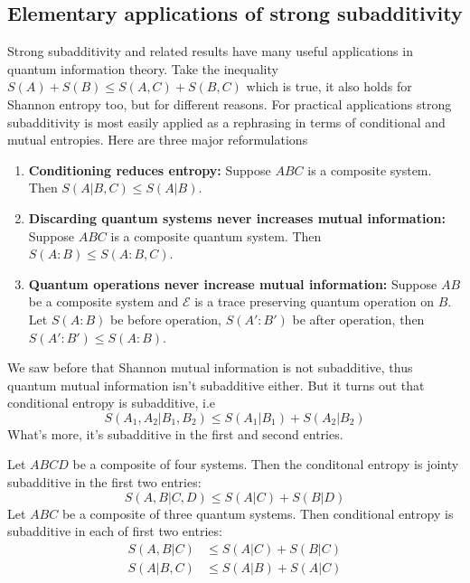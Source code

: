 \subsection{Elementary applications of strong subadditivity}
Strong subadditivity and related results have many useful applications in quantum information theory. Take the inequality $S(A)+S(B)\leq S(A,C)+S(B,C)$ which is true, it also holds for Shannon entropy too, but for different reasons. For practical applications strong subadditivity is most easily applied as a rephrasing in terms of conditional and mutual entropies. Here are three major reformulations
\begin{ntheorem}
    \begin{enumerate}
        \item \textbf{Conditioning reduces entropy:} Suppose $ABC$ is a composite system. Then $S(A|B,C)\leq S(A|B)$.
        \item \textbf{Discarding quantum systems never increases mutual information:} Suppose $ABC$ is a composite quantum system. Then $S(A:B) \leq S(A:B,C)$.
        \item \textbf{Quantum operations never increase mutual information:} Suppose $AB$ be a composite system and $\mathcal{E}$ is a trace preserving quantum operation on $B$. Let $S(A:B)$ be before operation, $S(A':B')$ be after operation, then $S(A':B') \leq S(A:B)$.
    \end{enumerate}
\end{ntheorem}
We saw before that Shannon mutual information is not subadditive, thus quantum mutual information isn't subadditive either. But it turns out that conditional entropy is subadditive, i.e
\begin{equation}
    S(A_1, A_2|B_1, B_2) \leq S(A_1|B_1) + S(A_2|B_2)
\end{equation}
What's more, it's subadditive in the first and second entries.
\begin{theorem}
    Let $ABCD$ be a composite of four systems. Then the conditonal entropy is jointy subadditive in the first two entries:
    \begin{equation}
        S(A,B|C,D) \leq S(A|C) + S(B|D)
    \end{equation}
    Let $ABC$ be a composite of three quantum systems. Then conditional entropy is subadditive in each of first two entries:
    \begin{align}
        S(A,B|C) &\leq S(A|C) + S(B|C) \\
        S(A|B, C) &\leq S(A|B) + S(A|C)
    \end{align}
\end{theorem}
